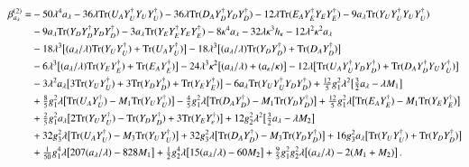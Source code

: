 \documentclass[final,3p,times,pdflatex]{elsarticle}
\newcommand{\lamsq}{\lambda^2}
\newcommand{\kapsq}{\kappa^2}
\newcommand{\tr}{\mathrm{Tr}}
\newcommand{\Alam}{a_\lambda/\lambda}
\newcommand{\Akap}{a_\kappa/\kappa}
\begin{document}
\begin{align}
\beta_{a_\lambda}^{(2)} =&-50\lambda^4 a_\lambda 
- 36\lambda\tr(U_A Y_U^\dagger Y_U Y_U^\dagger) 
- 36\lambda\tr(D_A Y_D^\dagger Y_D Y_D^\dagger)
- 12\lambda\tr(E_A Y_E^\dagger Y_E Y_E^\dagger) 
- 9a_\lambda\tr( Y_U Y_U^\dagger Y_U Y_U^\dagger) \notag \\
%
&- 9a_\lambda\tr( Y_D Y_D^\dagger Y_D Y_D^\dagger) 
- 3a_\lambda\tr( Y_E Y_E^\dagger Y_E Y_E^\dagger) - 8\kappa^4 a_\lambda 
- 32\lambda\kappa^3 h_\kappa - 12\lamsq\kapsq a_\lambda \notag \\
%
&-18\lambda^3\big[ (\Alam)\tr( Y_U Y_U^\dagger) + \tr(U_A Y_U^\dagger)\big] 
- 18\lambda^3\big[(\Alam)\tr( Y_D Y_D^\dagger) + \tr(D_A Y_D^\dagger)\big] \notag \\
%
&-6\lambda^3\big[(\Alam)\tr( Y_E Y_E^\dagger) + \tr(E_A Y_E^\dagger)\big] 
-24\lambda^3\kapsq\big[ (\Alam) + (\Akap)\big]
-12\lambda\big[ \tr(U_A Y_U^\dagger Y_D Y_D^\dagger) 
+ \tr(D_A Y_D^\dagger Y_U Y_U^\dagger) \big] \notag \\
%
&-3\lamsq a_\lambda\big[ 3\tr( Y_U Y_U^\dagger) + 3\tr( Y_D Y_D^\dagger) 
+ \tr( Y_E Y_E^\dagger) \big] -6a_\lambda\tr( Y_U Y_U^\dagger Y_D Y_D^\dagger) 
+ \tfrac{12}{5}g_1^2\lamsq\big[ \tfrac{3}{2}a_\lambda - \lambda M_1\big] \notag \\
%
&+\tfrac{8}{5}g_1^2\lambda\big[ \tr(U_A Y_U^\dagger) - M_1\tr( Y_U Y_U^\dagger) \big]
-\tfrac{4}{5}g_1^2\lambda\big[ \tr(D_A Y_D^\dagger) - M_1\tr( Y_D Y_D^\dagger)\big] 
+\tfrac{12}{5}g_1^2\lambda\big[\tr(E_A Y_E^\dagger) - M_1\tr( Y_E Y_E^\dagger)\big] 
\notag \\
%
&+\tfrac{2}{5}g_1^2 a_\lambda\big[ 2\tr( Y_U Y_U^\dagger) - \tr( Y_D Y_D^\dagger) 
+ 3\tr( Y_E Y_e^\dagger) \big] + 12g_2^2\lamsq\big[ \tfrac{3}{2}a_\lambda 
- \lambda M_2\big] \notag \\
%
&+32g_3^2\lambda\big[ \tr(U_A Y_U^\dagger) - M_3\tr( Y_U Y_U^\dagger) \big]
+32g_3^2\lambda\big[\tr(D_A Y_D^\dagger) - M_3\tr( Y_D Y_D^\dagger) \big] 
+ 16g_3^2 a_\lambda\big[ \tr( Y_U Y_U^\dagger) + \tr( Y_D Y_D^\dagger) \big] \notag \\
%
&+ \tfrac{1}{50}g_1^4\lambda\big[ 207(\Alam) - 828M_1\big] 
+ \tfrac{1}{2}g_2^4\lambda\big[ 15(\Alam) - 60M_2\big]
+\tfrac{9}{5}g_1^2 g_2^2\lambda\big[ (\Alam) - 2(M_1 + M_2)\big] \,.
\end{align}
\end{document}

